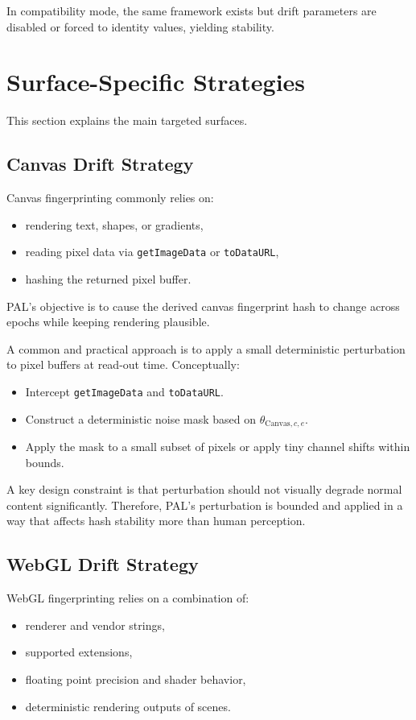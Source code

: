 \documentclass[11pt]{report}
\begin{document}
In compatibility mode, the same framework exists but drift parameters are disabled or forced to identity values, yielding stability.

\section{Surface-Specific Strategies}

This section explains the main targeted surfaces.

\subsection{Canvas Drift Strategy}

Canvas fingerprinting commonly relies on:
\begin{itemize}
    \item rendering text, shapes, or gradients,
    \item reading pixel data via \texttt{getImageData} or \texttt{toDataURL},
    \item hashing the returned pixel buffer.
\end{itemize}

PAL's objective is to cause the derived canvas fingerprint hash to change across epochs while keeping rendering plausible.

A common and practical approach is to apply a small deterministic perturbation to pixel buffers at read-out time. Conceptually:

\begin{itemize}
    \item Intercept \texttt{getImageData} and \texttt{toDataURL}.
    \item Construct a deterministic noise mask based on $\theta_{\text{Canvas},c,e}$.
    \item Apply the mask to a small subset of pixels or apply tiny channel shifts within bounds.
\end{itemize}

A key design constraint is that perturbation should not visually degrade normal content significantly. Therefore, PAL’s perturbation is bounded and applied in a way that affects hash stability more than human perception.

\subsection{WebGL Drift Strategy}

WebGL fingerprinting relies on a combination of:
\begin{itemize}
    \item renderer and vendor strings,
    \item supported extensions,
    \item floating point precision and shader behavior,
    \item deterministic rendering outputs of scenes.
\end{itemize}
\end{document}
